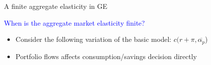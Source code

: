 \begin{frame}{A finite aggregate elasticity in GE}

\textcolor{blue}{When is the aggregate market elasticity finite?}
\begin{itemize}
	\item Consider the following variation of the basic model: $c(r+\pi, \overline{\alpha_p}$)
	\item Portfolio flows affects consumption/savings decision directly
\end{itemize} \pause
	
\end{frame}
